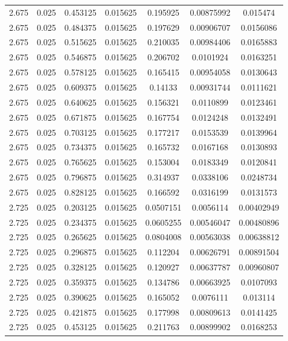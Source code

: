 \begin{table}[bh]
\begin{center}
{\begin{tabular}{ccccccc}
2.675	 & 0.025 & 	0.453125	 & 0.015625	 & 0.195925	 & 0.00875992	 & 0.015474 \\ 
2.675	 & 0.025 & 	0.484375	 & 0.015625	 & 0.197629	 & 0.00906707	 & 0.0156086 \\ 
2.675	 & 0.025 & 	0.515625	 & 0.015625	 & 0.210035	 & 0.00984406	 & 0.0165883 \\ 
2.675	 & 0.025 & 	0.546875	 & 0.015625	 & 0.206702	 & 0.0101924	 & 0.0163251 \\ 
2.675	 & 0.025 & 	0.578125	 & 0.015625	 & 0.165415	 & 0.00954058	 & 0.0130643 \\ 
2.675	 & 0.025 & 	0.609375	 & 0.015625	 & 0.14133	 & 0.00931744	 & 0.0111621 \\ 
2.675	 & 0.025 & 	0.640625	 & 0.015625	 & 0.156321	 & 0.0110899	 & 0.0123461 \\ 
2.675	 & 0.025 & 	0.671875	 & 0.015625	 & 0.167754	 & 0.0124248	 & 0.0132491 \\ 
2.675	 & 0.025 & 	0.703125	 & 0.015625	 & 0.177217	 & 0.0153539	 & 0.0139964 \\ 
2.675	 & 0.025 & 	0.734375	 & 0.015625	 & 0.165732	 & 0.0167168	 & 0.0130893 \\ 
2.675	 & 0.025 & 	0.765625	 & 0.015625	 & 0.153004	 & 0.0183349	 & 0.0120841 \\ 
2.675	 & 0.025 & 	0.796875	 & 0.015625	 & 0.314937	 & 0.0338106	 & 0.0248734 \\ 
2.675	 & 0.025 & 	0.828125	 & 0.015625	 & 0.166592	 & 0.0316199	 & 0.0131573 \\ 
2.725	 & 0.025 & 	0.203125	 & 0.015625	 & 0.0507151	 & 0.0056114	 & 0.00402949 \\ 
2.725	 & 0.025 & 	0.234375	 & 0.015625	 & 0.0605255	 & 0.00546047	 & 0.00480896 \\ 
2.725	 & 0.025 & 	0.265625	 & 0.015625	 & 0.0804008	 & 0.00563038	 & 0.00638812 \\ 
2.725	 & 0.025 & 	0.296875	 & 0.015625	 & 0.112204	 & 0.00626791	 & 0.00891504 \\ 
2.725	 & 0.025 & 	0.328125	 & 0.015625	 & 0.120927	 & 0.00637787	 & 0.00960807 \\ 
2.725	 & 0.025 & 	0.359375	 & 0.015625	 & 0.134786	 & 0.00663925	 & 0.0107093 \\ 
2.725	 & 0.025 & 	0.390625	 & 0.015625	 & 0.165052	 & 0.0076111	 & 0.013114 \\ 
2.725	 & 0.025 & 	0.421875	 & 0.015625	 & 0.177998	 & 0.00809613	 & 0.0141425 \\ 
2.725	 & 0.025 & 	0.453125	 & 0.015625	 & 0.211763	 & 0.00899902	 & 0.0168253 \\ 

\end{tabular}}
\end{center}
\end{table}
